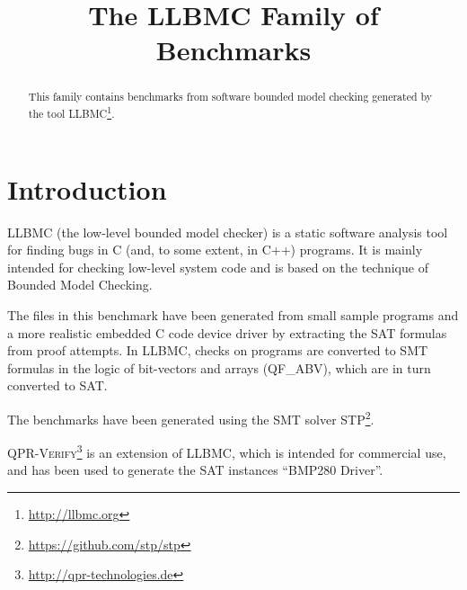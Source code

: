 \documentclass[conference]{IEEEtran}
\begin{document}

\title{The LLBMC Family of Benchmarks}

\author{
}
\maketitle


\begin{abstract}
This family contains benchmarks from software bounded model checking
generated by the tool LLBMC\footnote{\url{http://llbmc.org}}.
\end{abstract}

\section{Introduction}
LLBMC (the low-level bounded model checker) is a static software analysis
tool for finding bugs in C (and, to some extent, in C++) programs.
It is mainly intended for checking low-level system code and is based on the
technique of Bounded Model Checking.

The files in this benchmark have been generated from small sample programs
and a more realistic embedded C code device driver by extracting the SAT formulas
from proof attempts. In LLBMC, checks on programs are converted to SMT formulas
in the logic of bit-vectors and arrays (QF\_ABV), which are in turn converted to SAT.

The benchmarks have been generated using the SMT solver
STP\footnote{\url{https://github.com/stp/stp}}.

\textsc{QPR-Verify}\footnote{\url{http://qpr-technologies.de}} is an extension
of LLBMC, which is intended for commercial use,
and has been used to generate the SAT instances ``BMP280 Driver''.
\end{document}
